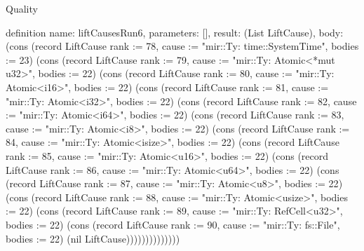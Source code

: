 \begin{lexlean}{Quality}
\begin{semanticmodule}
definition{
  name: liftCausesRun6,
  parameters: [],
  result: (List LiftCause),
  body: (cons (record LiftCause {rank := 78, cause := "mir::Ty: time::SystemTime", bodies := 23}) (cons (record LiftCause {rank := 79, cause := "mir::Ty: Atomic<*mut u32>", bodies := 22}) (cons (record LiftCause {rank := 80, cause := "mir::Ty: Atomic<i16>", bodies := 22}) (cons (record LiftCause {rank := 81, cause := "mir::Ty: Atomic<i32>", bodies := 22}) (cons (record LiftCause {rank := 82, cause := "mir::Ty: Atomic<i64>", bodies := 22}) (cons (record LiftCause {rank := 83, cause := "mir::Ty: Atomic<i8>", bodies := 22}) (cons (record LiftCause {rank := 84, cause := "mir::Ty: Atomic<isize>", bodies := 22}) (cons (record LiftCause {rank := 85, cause := "mir::Ty: Atomic<u16>", bodies := 22}) (cons (record LiftCause {rank := 86, cause := "mir::Ty: Atomic<u64>", bodies := 22}) (cons (record LiftCause {rank := 87, cause := "mir::Ty: Atomic<u8>", bodies := 22}) (cons (record LiftCause {rank := 88, cause := "mir::Ty: Atomic<usize>", bodies := 22}) (cons (record LiftCause {rank := 89, cause := "mir::Ty: RefCell<u32>", bodies := 22}) (cons (record LiftCause {rank := 90, cause := "mir::Ty: fs::File", bodies := 22}) (nil LiftCause))))))))))))))
}


\end{semanticmodule}
\end{lexlean}
